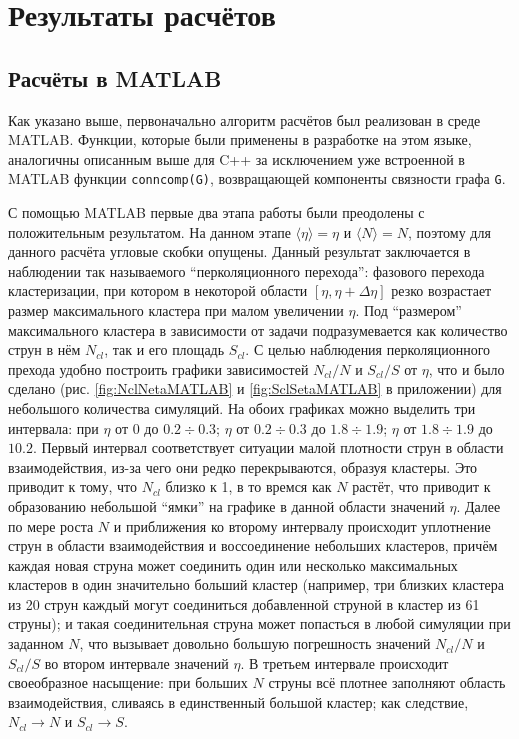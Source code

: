 \section{Результаты расчётов}
\subsection{Расчёты в MATLAB}
Как указано выше, первоначально алгоритм расчётов был реализован в среде MATLAB. Функции, которые были применены в разработке на этом языке, аналогичны описанным выше для C++ за исключением уже встроенной в MATLAB функции \texttt{conncomp(G)}, возвращающей компоненты связности графа \texttt{G}. 

С помощью MATLAB первые два этапа работы были преодолены с положительным результатом. На данном этапе $\langle \eta \rangle = \eta$ и $\langle N \rangle = N$, поэтому для данного расчёта угловые скобки опущены. 
Данный результат заключается в наблюдении так называемого ``перколяционного перехода'': фазового перехода кластеризации, при котором в некоторой области $[\eta, \eta + \Delta \eta]$ резко возрастает размер максимального кластера при малом увеличении $\eta$. 
Под ``размером'' максимального кластера в зависимости от задачи подразумевается как количество струн в нём $N_{cl}$, так и его площадь $S_{cl}$. 
С целью наблюдения перколяционного прехода удобно построить графики зависимостей $N_{cl}/N$ и $S_{cl}/S$ от $\eta$, что и было сделано (рис. \ref{fig:NclNetaMATLAB} и \ref{fig:SclSetaMATLAB} в приложении) для небольшого количества симуляций. 
На обоих графиках можно выделить три интервала: при $\eta$ от 0 до $0.2 \div 0.3$; $\eta$ от $0.2 \div 0.3$ до $1.8 \div 1.9$; $\eta$ от $1.8 \div 1.9$ до $10.2$. 
Первый интервал соответствует ситуации малой плотности струн в области взаимодействия, из-за чего они редко перекрываются, образуя кластеры.
Это приводит к тому, что $N_{cl}$ близко к 1, в то времся как $N$ растёт, что приводит к образованию небольшой ``ямки'' на графике в данной области значений $\eta$.
Далее по мере роста $N$ и приближения ко второму интервалу происходит уплотнение струн в области взаимодействия и воссоединение небольших кластеров, причём каждая новая струна может соединить один или несколько максимальных кластеров в один значительно больший кластер (например, три близких кластера из 20 струн каждый могут соединиться добавленной струной в кластер из 61 струны); и такая соединительная струна может попасться в любой симуляции при заданном $N$, что вызывает довольно большую погрешность значений $N_{cl}/N$ и $S_{cl}/S$ во втором интервале значений $\eta$. 
В третьем интервале происходит своеобразное насыщение: при больших $N$ струны всё плотнее заполняют область взаимодействия, сливаясь в единственный большой кластер; как следствие, $N_{cl} \rightarrow N$ и $S_{cl} \rightarrow S$.


